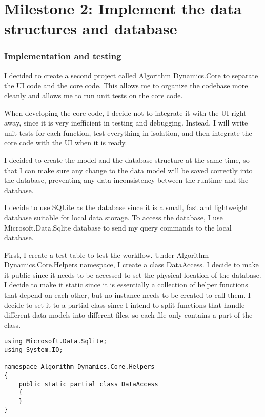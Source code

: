 \documentclass[report.tex]{subfiles}
\begin{document}
\section{Milestone 2: Implement the data structures and database}

\subsubsection{Implementation and testing}

I decided to create a second project called Algorithm Dynamics.Core to separate the UI code and the core code. This allows me to organize the codebase more cleanly and allows me to run unit tests on the core code.

When developing the core code, I decide not to integrate it with the UI right away, since it is very inefficient in testing and debugging. Instead, I will write unit tests for each function, test everything in isolation, and then integrate the core code with the UI when it is ready.

I decided to create the model and the database structure at the same time, so that I can make sure any change to the data model will be saved correctly into the database, preventing any data inconsistency between the runtime and the database.

I decide to use SQLite\cite{sqlite} as the database since it is a small, fast and lightweight database suitable for local data storage. To access the database, I use Microsoft.Data.Sqlite\cite{microsoft:docs:sqlite} database to send my query commands to the local database.

First, I create a test table to test the workflow. Under Algorithm Dynamics.Core.Helpers namespace, I create a class DataAccess. I decide to make it public since it needs to be accessed to set the physical location of the database. I decide to make it static since it is essentially a collection of helper functions that depend on each other, but no instance needs to be created to call them. I decide to set it to a partial class since I intend to split functions that handle different data models into different files, so each file only contains a part of the class.

\begin{verbatim}
using Microsoft.Data.Sqlite;
using System.IO;

namespace Algorithm_Dynamics.Core.Helpers
{
    public static partial class DataAccess
    {
    }
}
\end{verbatim}
\end{document}
